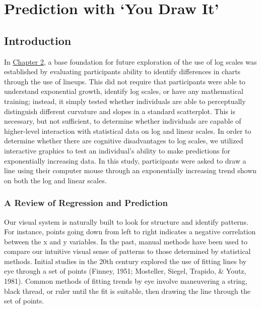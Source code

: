 \documentclass[print]{nuthesis}
\begin{document}
\hypertarget{youdrawit}{%
\chapter{Prediction with `You Draw It'}\label{youdrawit}}

\hypertarget{introduction-1}{%
\section{Introduction}\label{introduction-1}}

In \protect\hyperlink{lineups}{Chapter 2}, a base foundation for future exploration of the use of log scales was established by evaluating participants ability to identify differences in charts through the use of lineups.
This did not require that participants were able to understand exponential growth, identify log scales, or have any mathematical training; instead, it simply tested whether individuals are able to perceptually distinguish different curvature and slopes in a standard scatterplot.
This is necessary, but not sufficient, to determine whether individuals are capable of higher-level interaction with statistical data on log and linear scales.
In order to determine whether there are cognitive disadvantages to log scales, we utilized interactive graphics to test an individual's ability to make predictions for exponentially increasing data.
In this study, participants were asked to draw a line using their computer mouse through an exponentially increasing trend shown on both the log and linear scales.

\hypertarget{a-review-of-regression-and-prediction}{%
\subsection{A Review of Regression and Prediction}\label{a-review-of-regression-and-prediction}}

Our visual system is naturally built to look for structure and identify patterns.
For instance, points going down from left to right indicates a negative correlation between the x and y variables.
In the past, manual methods have been used to compare our intuitive visual sense of patterns to those determined by statistical methods.
Initial studies in the 20th century explored the use of fitting lines by eye through a set of points (Finney, 1951; Mosteller, Siegel, Trapido, \& Youtz, 1981).
Common methods of fitting trends by eye involve maneuvering a string, black thread, or ruler until the fit is suitable, then drawing the line through the set of points.
\end{document}

